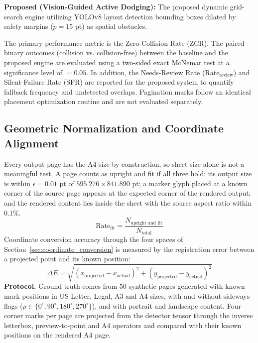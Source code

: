 \textbf{Proposed (Vision-Guided Active Dodging):} The proposed dynamic grid-search engine utilizing YOLOv8 layout detection bounding boxes dilated by safety margins ($p=15$ pt) as spatial obstacles.

The primary performance metric is the Zero-Collision Rate (ZCR). The paired binary outcomes (collision vs. collision-free) between the baseline and the proposed engine are evaluated using a two-sided exact McNemar test at a significance level of $=0.05$. In addition, the Needs-Review Rate ($\mathrm{Rate}_{\mathrm{review}}$) and Silent-Failure Rate (SFR) are reported for the proposed system to quantify fallback frequency and undetected overlaps. Pagination marks follow an identical placement optimization routine and are not evaluated separately.

\subsection{Geometric Normalization and Coordinate Alignment}
\label{sec:eval_geom_normalization}

Every output page has the A4 size by construction, so sheet size alone is not a meaningful test. A page counts as upright and fit if all three hold: its output size is within $\epsilon=0.01$ pt of $595.276\times841.890$ pt; a marker glyph placed at a known corner of the source page appears at the expected corner of the rendered output; and the rendered content lies inside the sheet with the source aspect ratio within 0.1\%.
\begin{equation}
\label{eq:rate_fit}
\text{Rate}_{\text{fit}} = \frac{N_{\text{upright and fit}}}{N_{\text{total}}}
\end{equation}
Coordinate conversion accuracy through the four spaces of Section~\ref{sec:coordinate_conversion} is measured by the registration error between a projected point and its known position:
\begin{equation}
\label{eq:registration_error}
\Delta E = \sqrt{(x_{\text{projected}} - x_{\text{actual}})^2 + (y_{\text{projected}} - y_{\text{actual}})^2}
\end{equation}
\textbf{Protocol.} Ground truth comes from 50 synthetic pages generated with known mark positions in US Letter, Legal, A3 and A4 sizes, with and without sideways flags ($\rho\in\{0^\circ,90^\circ,180^\circ,270^\circ\}$), and with portrait and landscape content. Four corner marks per page are projected from the detector tensor through the inverse letterbox, preview-to-point and A4 operators and compared with their known positions on the rendered A4 page.

